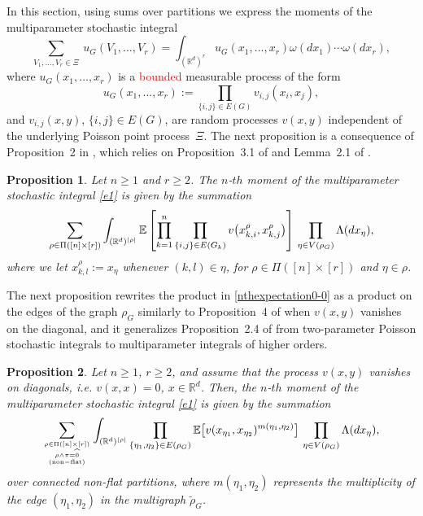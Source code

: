 \documentclass[12pt]{article}
\newcommand{\R}{\mathbb{R}}
\newcommand{\E}{\mathbb{E}}
\newtheorem{prop}{Proposition}[section]
\def\real{{\mathord{\mathbb R}}}
\numberwithin{equation}{section}
\begin{document}
 In this section, using sums over partitions
 we express the moments of the multiparameter stochastic integral 
\begin{equation}
\label{e1}
 \sum_{V_1,\dots,V_r \in\Xi} \ u_G (V_1,\ldots , V_r ) 
 = \int_{(\real^d)^r} u_G (x_1,\ldots , x_r ) \omega (dx_1)\cdots \omega (dx_r), 
\end{equation} 
 where $u_G (x_1,\ldots , x_r )$ is a \textcolor{red}{bounded} measurable process of the form 
$$
 u_G (x_1,\ldots , x_r ) := \prod_{\{i,j\} \in E(G)} v_{i,j}(x_i,x_j), 
$$
 and $v_{i,j}(x,y)$, $\{i,j\}\in E(G)$,
 are random processes $v(x,y)$
 independent of the underlying Poisson point process~$\Xi$. 
 The next proposition is a consequence of Proposition~2 in \cite{prkhp}, 
which relies on Proposition~3.1 of \cite{momentpoi} %
and Lemma~2.1 of \cite{bogdan}. 
\begin{prop}
\label{p01-1-0} 
Let $n \geq 1$ and $r\geq 2$. 
The $n$-$th$ moment of the multiparameter stochastic integral
 \eqref{e1} is given by the summation 
\begin{equation} 
\label{nthexpectation0-0} 
\sum_{\rho \in \Pi ( [n] \times [r] )}
\int_{(\R^d )^{|\rho |}}
\E \left[
  \prod_{k=1}^n
\prod_{%
\{i,j\}\in E(G_k)}
v\big(x^\rho_{k,i},x^\rho_{k,j}\big) %
\right] 
   \ \! \prod_{\eta \in V(\rho_G)}
   \Lambda(dx_\eta ),
\end{equation}
 where we let $x_{k,l}^\rho:=x_\eta$ whenever $(k,l)\in \eta$,
 for $\rho \in \Pi([n]\times [r])$ and $\eta\in\rho$.
\end{prop}
 The next proposition rewrites the product in \eqref{nthexpectation0-0} 
 as a product on the edges of the graph $\rho_G$ 
 similarly to Proposition~4 of \cite{prkhp} when $v(x,y)$ vanishes on
 the diagonal, and it generalizes
 Proposition~2.4 of \cite{jansen}
 from two-parameter Poisson stochastic
 integrals to multiparameter integrals of higher orders. 
\begin{prop}
\label{p01-1-4} 
Let $n \geq 1$, $r\geq 2$, and assume that the process $v(x,y)$ vanishes
on diagonals, i.e. $v(x,x) = 0$, $x\in \real^d$. 
Then, the $n$-$th$ moment of the multiparameter stochastic integral
 \eqref{e1} is given by the summation 
\begin{equation} 
\nonumber %
\sum_{\rho \in \Pi ( [n] \times [r] )
\atop {
    \rho \wedge \pi = \widehat{0}
    \atop
        {\rm (non-flat)}
}
}
\int_{(\R^d )^{|\rho |}}
  \prod_{\{\eta_1,\eta_2\} \in E(\rho_G)}
 \E \big[ v(x_{\eta_1},x_{\eta_2})^{m({\eta_1,\eta_2})} \big] 
   \ \! \prod_{\eta \in V(\rho_G)}
\Lambda(dx_\eta ), 
\end{equation} 
over connected non-flat partitions,
where $m ({\eta_1,\eta_2})$ represents the multiplicity of the edge
$(\eta_1,\eta_2)$ in the multigraph $\widetilde{\rho}_G$. 
\end{prop}
\end{document}

